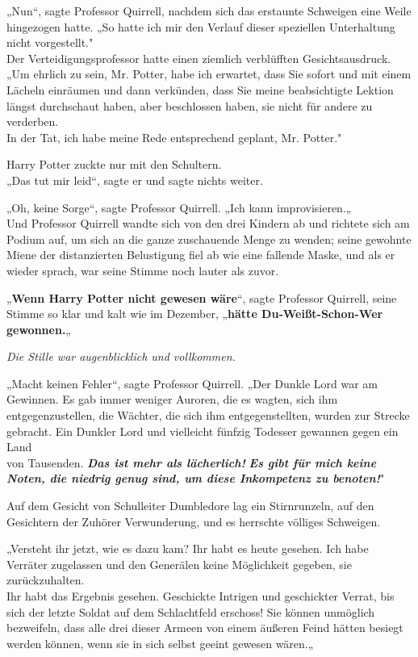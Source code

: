 {„Nun“, sagte Professor Quirrell, nachdem sich das erstaunte Schweigen eine Weile hingezogen hatte. „So hatte ich mir den Verlauf dieser speziellen Unterhaltung nicht vorgestellt."\\ Der Verteidigungsprofessor hatte einen ziemlich verblüfften Gesichtsausdruck.\\ „Um ehrlich zu sein, Mr. Potter, habe ich erwartet, dass Sie sofort und mit einem Lächeln einräumen und dann verkünden, dass Sie meine beabsichtigte Lektion längst durchschaut haben, aber beschlossen haben, sie nicht für andere zu verderben.\\ In der Tat, ich habe meine Rede entsprechend geplant, Mr. Potter."

Harry Potter zuckte nur mit den Schultern.\\ „Das tut mir leid“, sagte er und sagte nichts weiter.

„Oh, keine Sorge“, sagte Professor Quirrell. „Ich kann improvisieren.„\\ Und Professor Quirrell wandte sich von den drei Kindern ab und richtete sich am Podium auf, um sich an die ganze zuschauende Menge zu wenden; seine gewohnte Miene der distanzierten Belustigung fiel ab wie eine fallende Maske, und als er wieder sprach, war seine Stimme noch lauter als zuvor.

„\textbf{Wenn Harry Potter nicht gewesen wäre}“, sagte Professor Quirrell, seine Stimme so klar und kalt wie im Dezember, „\textbf{hätte Du-Weißt-Schon-Wer gewonnen.}„

\emph{Die Stille war augenblicklich und vollkommen.}

„Macht keinen Fehler“, sagte Professor Quirrell. „Der Dunkle Lord war am Gewinnen. Es gab immer weniger Auroren, die es wagten, sich ihm entgegenzustellen, die Wächter, die sich ihm entgegenstellten, wurden zur Strecke gebracht. Ein Dunkler Lord und vielleicht fünfzig Todesser gewannen gegen ein Land\\ von Tausenden. \textbf{\emph{Das ist mehr als lächerlich!}} \textbf{\emph{Es gibt für mich keine Noten, die niedrig genug sind, um diese Inkompetenz zu benoten!}}"

Auf dem Gesicht von Schulleiter Dumbledore lag ein Stirnrunzeln, auf den Gesichtern der Zuhörer Verwunderung, und es herrschte völliges Schweigen.

„Versteht ihr jetzt, wie es dazu kam? Ihr habt es heute gesehen. Ich habe Verräter zugelassen und den Generälen keine Möglichkeit gegeben, sie zurückzuhalten.\\ Ihr habt das Ergebnis gesehen. Geschickte Intrigen und geschickter Verrat, bis sich der letzte Soldat auf dem Schlachtfeld erschoss! Sie können unmöglich bezweifeln, dass alle drei dieser Armeen von einem äußeren Feind hätten besiegt werden können, wenn sie in sich selbst geeint gewesen wären.„

}
